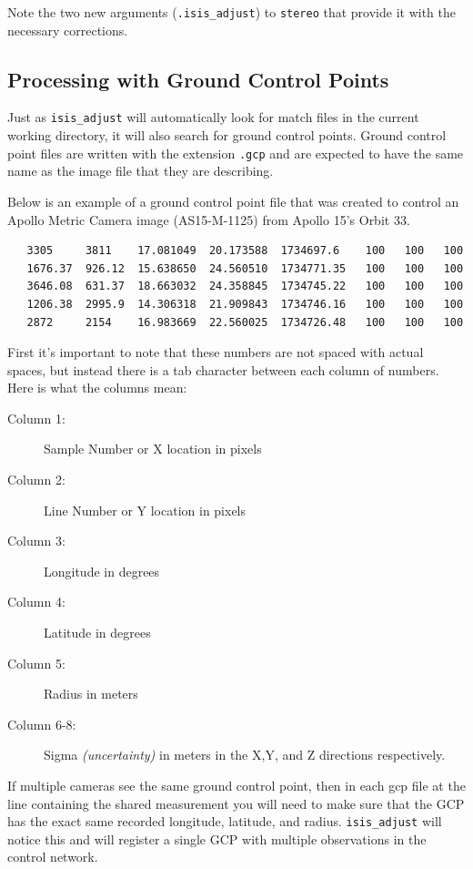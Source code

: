 Note the two new arguments ({\tt *.isis\_adjust}) to \texttt{stereo}
that provide it with the necessary corrections.

\subsection{Processing with Ground Control Points}

Just as \texttt{isis\_adjust} will automatically look for match files
in the current working directory, it will also search for ground
control points. Ground control point files are written with the
extension \verb=.gcp= and are expected to have the same name as the
image file that they are describing.

Below is an example of a ground control point file that was created to
control an Apollo Metric Camera image (AS15-M-1125) from Apollo 15's
Orbit 33.

\begin{verbatim}
   3305     3811    17.081049  20.173588  1734697.6    100   100   100
   1676.37  926.12  15.638650  24.560510  1734771.35   100   100   100
   3646.08  631.37  18.663032  24.358845  1734745.22   100   100   100
   1206.38  2995.9  14.306318  21.909843  1734746.16   100   100   100
   2872     2154    16.983669  22.560025  1734726.48   100   100   100
\end{verbatim}

First it's important to note that these numbers are not spaced with
actual spaces, but instead there is a tab character between each
column of numbers. Here is what the columns mean:

\begin{myindentpar}{2cm}
\begin{description}
  \item[Column 1:] Sample Number or X location in pixels
  \item[Column 2:] Line Number or Y location in pixels
  \item[Column 3:] Longitude in degrees 
  \item[Column 4:] Latitude in degrees
  \item[Column 5:] Radius in meters
  \item[Column 6-8:] Sigma \emph{(uncertainty)} in meters in the X,Y,
    and Z directions respectively.
\end{description}
\end{myindentpar}

If multiple cameras see the same ground control point, then in each
gcp file at the line containing the shared measurement you will need
to make sure that the GCP has the exact same recorded longitude,
latitude, and radius. \texttt{isis\_adjust} will notice this and will
register a single GCP with multiple observations in the control
network.

